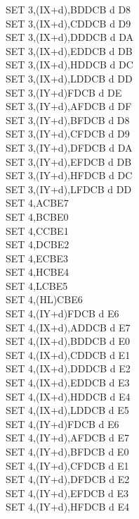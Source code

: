 \documentclass[12pt,twoside,openright,a4paper]{book}
\begin{document}
\begin{multicols}{3}
{\begin{tabbing}
		SET 3,(IX+d),B\UNDOC\>DDCB d D8\\
		SET 3,(IX+d),C\UNDOC\>DDCB d D9\\
		SET 3,(IX+d),D\UNDOC\>DDCB d DA\\
		SET 3,(IX+d),E\UNDOC\>DDCB d DB\\
		SET 3,(IX+d),H\UNDOC\>DDCB d DC\\
		SET 3,(IX+d),L\UNDOC\>DDCB d DD\\
		SET 3,(IY+d)\>FDCB d DE\\
		SET 3,(IY+d),A\UNDOC\>FDCB d DF\\
		SET 3,(IY+d),B\UNDOC\>FDCB d D8\\
		SET 3,(IY+d),C\UNDOC\>FDCB d D9\\
		SET 3,(IY+d),D\UNDOC\>FDCB d DA\\
		SET 3,(IY+d),E\UNDOC\>FDCB d DB\\
		SET 3,(IY+d),H\UNDOC\>FDCB d DC\\
		SET 3,(IY+d),L\UNDOC\>FDCB d DD\\
		SET 4,A\>CBE7\\
		SET 4,B\>CBE0\\
		SET 4,C\>CBE1\\
		SET 4,D\>CBE2\\
		SET 4,E\>CBE3\\
		SET 4,H\>CBE4\\
		SET 4,L\>CBE5\\
		SET 4,(HL)\>CBE6\\
		SET 4,(IY+d)\>FDCB d E6\\
		SET 4,(IX+d),A\UNDOC\>DDCB d E7\\
		SET 4,(IX+d),B\UNDOC\>DDCB d E0\\
		SET 4,(IX+d),C\UNDOC\>DDCB d E1\\
		SET 4,(IX+d),D\UNDOC\>DDCB d E2\\
		SET 4,(IX+d),E\UNDOC\>DDCB d E3\\
		SET 4,(IX+d),H\UNDOC\>DDCB d E4\\
		SET 4,(IX+d),L\UNDOC\>DDCB d E5\\
		SET 4,(IY+d)\>FDCB d E6\\
		SET 4,(IY+d),A\UNDOC\>FDCB d E7\\
		SET 4,(IY+d),B\UNDOC\>FDCB d E0\\
		SET 4,(IY+d),C\UNDOC\>FDCB d E1\\
		SET 4,(IY+d),D\UNDOC\>FDCB d E2\\
		SET 4,(IY+d),E\UNDOC\>FDCB d E3\\
		SET 4,(IY+d),H\UNDOC\>FDCB d E4\\

\end{tabbing}}
\end{multicols}
\end{document}
